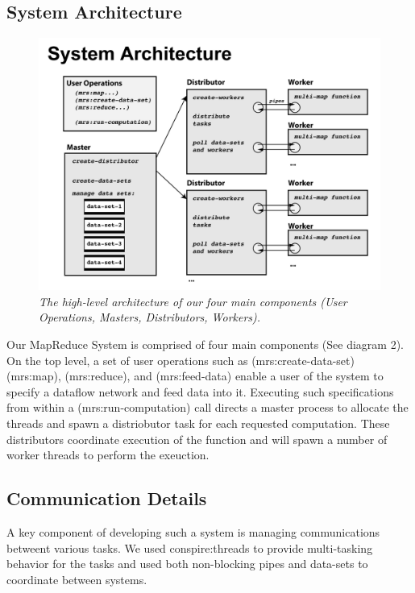 \documentclass{article}
\begin{document}
\subsection{System Architecture}

\begin{figure}[h!]
\includegraphics[width=\textwidth]{system-arch.png}
  \caption{\emph{\small The high-level architecture of our four main
      components (User Operations, Masters, Distributors, Workers).}}
\label{piefig}
\end{figure}

Our MapReduce System is comprised of four main components (See diagram
2). On the top level, a set of user operations such as (mrs:create-data-set)
(mrs:map), (mrs:reduce), and (mrs:feed-data) enable a user
of the system to specify a dataflow network and feed data into
it. Executing such specifications from within a
(mrs:run-computation) call directs a master process to allocate the
threads and spawn a distriobutor task for each requested
computation. These distributors coordinate execution of the function
and will spawn a number of worker threads to perform the exeuction.

\subsection{Communication Details}

A key component of developing such a system is managing communications
betweent various tasks. We used conspire:threads to provide
multi-tasking behavior for the tasks and used both non-blocking pipes
and data-sets to coordinate between systems. 
\end{document}
